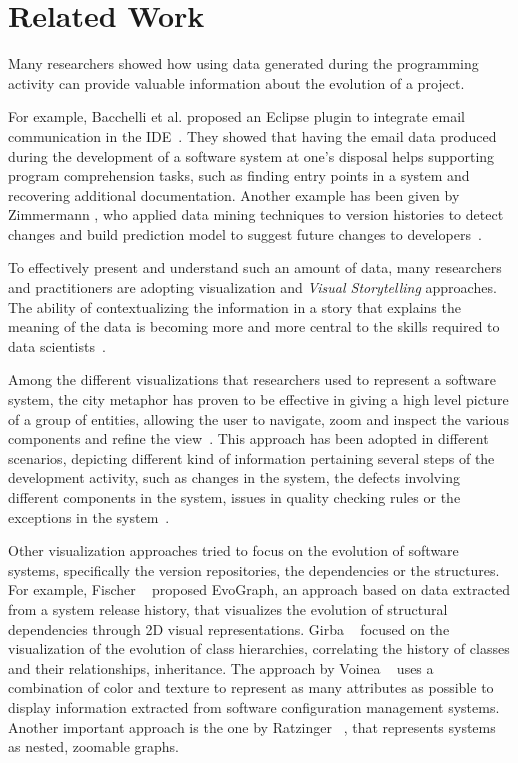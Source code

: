 \section{Related Work}\label{sec:related}

Many researchers showed how using data generated during the programming activity can provide valuable information about the evolution of a project. 

For example, Bacchelli et al. proposed an Eclipse plugin to integrate email communication in the IDE~\cite{Bacc2011a}. They showed that having the email data produced during the development of a software system at one's disposal helps supporting program comprehension tasks, such as finding entry points in a system and recovering additional documentation.
Another example has been given by Zimmermann \etal, who applied data mining techniques to version histories to detect changes and build prediction model to suggest future changes to developers~\cite{Zimm2004a}.

To effectively present and understand such an amount of data, many researchers and practitioners are adopting visualization and \emph{Visual Storytelling} approaches. The ability of contextualizing the information in a story that explains the meaning of the data is becoming more and more central to the skills required to data scientists~\cite{Segel2010a}.

Among the different visualizations that researchers used to represent a software system, the city metaphor has proven to be effective in giving a high level picture of a group of entities, allowing the user to navigate, zoom and inspect the various components and refine the view~\cite{Wett2011a}. This approach has been adopted in different scenarios, depicting different kind of information pertaining several steps of the development activity, such as changes in the system, the defects involving different components in the system, issues in quality checking rules or the exceptions in the system~\cite{Panas2003a}.

Other visualization approaches tried to focus on the evolution of software systems, specifically the version repositories, the dependencies or the structures. For example, Fischer \etal~\cite{Fisch2006a} proposed EvoGraph, an approach based on data extracted from a system release history, that visualizes the evolution of structural dependencies through 2D visual representations. Girba \etal~\cite{Girb2005a} focused on the visualization of the evolution of class hierarchies, correlating the history of classes and their relationships, \eg inheritance. The approach by Voinea \etal~\cite{Voin2007a} uses a combination of color and texture to represent as many attributes as possible to display information extracted from software configuration management systems. Another important approach is the one by Ratzinger \etal~\cite{Ratz2005a}, that represents systems as nested, zoomable graphs.

